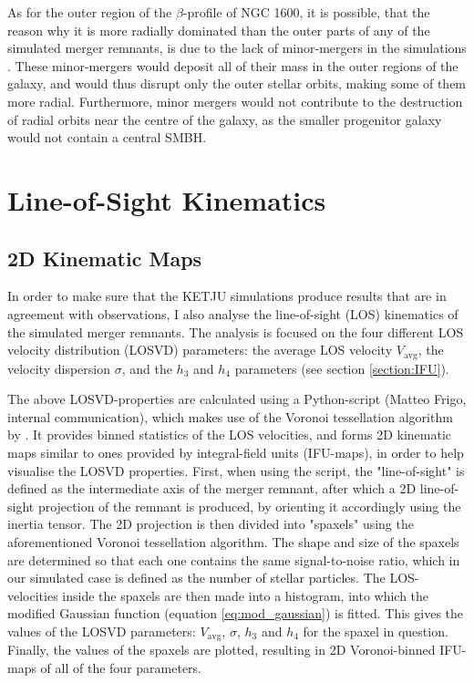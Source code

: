 \documentclass[english, twoside]{HYgradu}
\begin{document}
As for the outer region of the $\beta$-profile of NGC 1600, it is possible, that the reason why it is more radially dominated than the outer parts of any of the simulated merger remnants, is due to the lack of minor-mergers in the simulations \citep{Rantala2018}. These minor-mergers would deposit all of their mass in the outer regions of the galaxy, and would thus disrupt only the outer stellar orbits, making some of them more radial. Furthermore, minor mergers would not contribute to the destruction of radial orbits near the centre of the galaxy, as the smaller progenitor galaxy would not contain a central SMBH.

\section{Line-of-Sight Kinematics}

\subsection{2D Kinematic Maps}

In order to make sure that the KETJU simulations produce results that are in agreement with observations, I also analyse the line-of-sight (LOS) kinematics of the simulated merger remnants. The analysis is focused on the four different LOS velocity distribution (LOSVD) parameters: the average LOS velocity $V_\mathrm{avg}$, the velocity dispersion $\sigma$, and the $h_3$ and $h_4$ parameters (see section \ref{section:IFU}). 

The above LOSVD-properties are calculated using a Python-script (Matteo Frigo, internal communication), which makes use of the Voronoi tessellation algorithm by \cite{Cappellari2003}. It provides binned statistics of the LOS velocities, and forms 2D kinematic maps similar to ones provided by integral-field units (IFU-maps), in order to help visualise the LOSVD properties. First, when using the script, the "line-of-sight" is defined as the intermediate axis of the merger remnant, after which a 2D line-of-sight projection of the remnant is produced, by orienting it accordingly using the inertia tensor. The 2D projection is then divided into "spaxels" using the aforementioned Voronoi tessellation algorithm. The shape and size of the spaxels are determined so that each one contains the same signal-to-noise ratio, which in our simulated case is defined as the number of stellar particles. The LOS-velocities inside the spaxels are then made into a histogram, into which the modified Gaussian function (equation \ref{eq:mod_gaussian}) is fitted. This gives the values of the LOSVD parameters: $V_\mathrm{avg}$, $\sigma$, $h_3$ and $h_4$ for the spaxel in question. Finally, the values of the spaxels are plotted, resulting in 2D Voronoi-binned IFU-maps of all of the four parameters.
\end{document}

